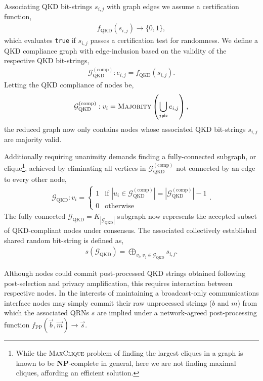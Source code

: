 Associating QKD bit-strings $s_{i,j}$ with graph edges we assume a certification function,
\begin{align} \label{eq:QKD_verif}
	f_\mathrm{QKD}(s_{i,j})\to \{0,1\},
\end{align}
which evaluates \texttt{true} if $s_{i,j}$ passes a certification test for randomness. We define a QKD compliance graph with edge-inclusion based on the validity of the respective QKD bit-strings,
\begin{align}
	\mathcal{G}_\mathrm{QKD}^{(\mathrm{comp})}: e_{i,j} = f_\mathrm{QKD}(s_{i,j}).
\end{align}
Letting the QKD compliance of nodes be,
\begin{align} \label{eq:QKD_node_comp}
	\mathcal{G}_\mathrm{QKD}^{(\mathrm{comp})}: v_i = \textsc{Majority}\left(\bigcup_{j\neq i} e_{i,j}\right),
\end{align}
the reduced graph now only contains nodes whose associated QKD bit-strings $s_{i,j}$ are majority valid.

Additionally requiring unanimity demands finding a fully-connected subgraph, or clique\footnote{While the \textsc{MaxClique} problem of finding the largest cliques in a graph is known to be \textbf{NP}-complete in general, here we are not finding maximal cliques, affording an efficient solution.}, achieved by eliminating all vertices in $\mathcal{G}_\mathrm{QKD}^{\mathrm{(comp)}}$ not connected by an edge to every other node,
\begin{align}
	\mathcal{G}_\mathrm{QKD}: v_i =
	\begin{cases}
		1 & \text{if } |u_i \in \mathcal{G}_\mathrm{QKD}^{\mathrm{(comp)}}| = |\mathcal{G}_\mathrm{QKD}^{\mathrm{(comp)}}| - 1 \\
		0 & \text{otherwise}
	\end{cases}.
\end{align}
The fully connected \mbox{$\mathcal{G}_\mathrm{QKD}= K_{|\mathcal{G}_\mathrm{QKD}|}$} subgraph now represents the accepted subset of QKD-compliant nodes under consensus. The associated collectively established shared random bit-string is defined as,
\begin{align}
	s(\mathcal{G}_\mathrm{QKD}) = \bigoplus_{v_i,v_j\in \mathcal{G}_\mathrm{QKD}} {s_{i,j}}.
\end{align}

Although nodes could commit post-processed QKD strings obtained following post-selection and privacy amplification, this requires interaction between respective nodes. In the interests of maintaining a broadcast-only communications interface nodes may simply commit their raw unprocessed strings ($b$ and $m$) from which the associated QRNs $s$ are implied under a network-agreed post-processing function $f_\mathrm{PP}(\vec{b},\vec{m})\to \vec{s}$.

